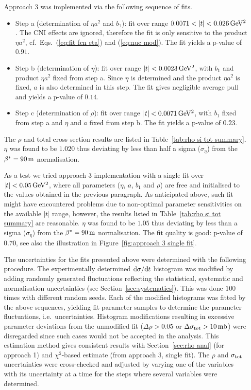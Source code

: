 Approach 3 was implemented via the following sequence of fits.
\begin{itemize}[noitemsep,topsep=0pt]
\item Step a (determination of $\eta a^2$ and $b_1$): fit over range $0.0071 < |t| < 0.026\,{\rm GeV^2}$. The CNI effects are ignored, therefore the fit is only sensitive to the product $\eta a^2$, cf.~Eqs.~(\ref{eq:fit fcn eta}) and (\ref{eq:nuc mod}). The fit yields a p-value of $0.91$.
\item Step b (determination of $\eta$): fit over range $|t| < 0.0023\,{\rm GeV^2}$, with $b_1$ and product $\eta a^2$ fixed from step a. Since $\eta$ is determined and the product $\eta a^2$ is fixed, $a$ is also determined in this step. The fit gives negligible average pull and yields a p-value of $0.14$.
\item Step c (determination of $\rho$): fit over range $|t| < 0.0071\,{\rm GeV^2}$, with $b_1$ fixed from step a and $\eta$ and $a$ fixed from step b. The fit yields a p-value of $0.23$.
\end{itemize}
The $\rho$ and total cross-section results are listed in Table~\ref{tab:rho si tot summary}. $\eta$ was found to be $1.020$ thus deviating by less than half a sigma ($\sigma_\eta$) from the $\beta^* = 90\,{\rm m}$ normalisation.

As a test we tried approach 3 implementation with a single fit over $|t| < 0.05\,{\rm GeV^2}$, where all parameters ($\eta$, $a$, $b_1$ and $\rho$) are free and initialised to the values obtained in the previous paragraph. As anticipated above, such fit might have encountered problems due to non-optimal parameter sensitivities on the available $|t|$ range, however, the results listed in Table~\ref{tab:rho si tot summary} are reasonable. $\eta$ was found to be $1.05$ thus deviating by less than a sigma ($\sigma_\eta$) from the $\beta^* = 90\,{\rm m}$ normalisation. The fit quality is good: p-value of $0.70$, see also the illustration in Figure~\ref{fig:approach 3 single fit}.

The uncertainties for the fits presented above were determined with the following procedure. The experimentally determined ${\rm d}\sigma/{\rm d} t$ histogram was modified by adding randomly generated fluctuations reflecting the statistical, systematic and normalisation uncertainties (see Section~\ref{sec:systematics}). This was done $100$ times with different random seeds. Each of the modified histograms was fitted by the above sequences, yielding fit parameter samples to determine the parameter fluctuations, i.e.~uncertainties. Histogram modifications resulting in excessive parameter deviations from the unmodified fit ($\Delta\rho > 0.05$ or $\Delta\sigma_{\rm tot} > 10\,{\rm mb}$) were disregarded since such cases would not be accepted in the analysis. This estimation method gives consistent results with Section~\ref{sec:rho anal} (for approach 1) and $\chi^2$-based estimate (from approach 3, single fit). The $\rho$ and $\sigma_{\rm tot}$ uncertainties were cross-checked and adjusted by varying one of the variables with its uncertainty at a time for the steps where several variables were determined.

